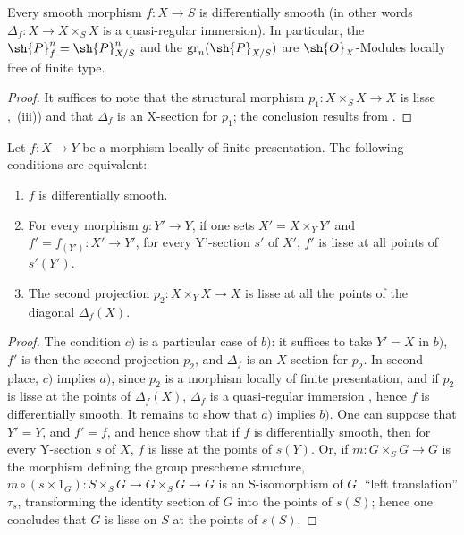 \begin{proposition}[17.12.4]
\label{IV.17.12.4}
Every smooth morphism $f:X\to S$ is differentially smooth (in other words  $\Delta_f:X\to X\times_S X$ is a quasi-regular immersion).
In particular, the $\sh{P}^n_f=\sh{P}^n_{X/S}$ and the $\operatorname{gr}_n(\sh{P}_{X/S})$ are $\sh{O}_X$-Modules locally free of finite type.
\end{proposition}

\begin{proof}
It suffices to note that the structural morphism $p_1:X\times_S X\to X$ is lisse ,~(iii)) and that $\Delta_f$ is an X-section for $p_1$; the conclusion results from .
\end{proof}

\begin{proposition}[17.12.5]
\label{IV.17.12.5}
Let $f:X\to Y$ be a morphism locally of finite presentation.
The following conditions are equivalent:
\begin{enumerate}
  \item[a)] $f$ is differentially smooth.
  \item[b)] For every morphism $g:Y'\to Y$, if one sets $X'=X\times_Y Y'$ and $f'=f_{(Y')}:X'\to Y'$, for every Y'-section $s'$ of $X'$, $f'$ is lisse at all points of $s'(Y')$.
  \item[c)] The second projection $p_2:X\times_Y X\to X$ is lisse at all the points of the diagonal $\Delta_f(X)$.
\end{enumerate}
\end{proposition}


\begin{proof}
The condition $c)$ is a particular case of $b)$: it suffices to take $Y'=X$ in $b)$, $f'$ is then the second projection $p_2$, and $\Delta_f$ is an $X$-section for $p_2$.
In second place, $c)$ implies $a)$, since $p_2$ is a morphism locally of finite presentation, and if $p_2$ is lisse at the points of $\Delta_f(X)$, $\Delta_f$ is a quasi-regular immersion , hence $f$ is differentially smooth.
It remains to show that $a)$ implies $b)$.
One can suppose that $Y'=Y$, and $f'=f$, and hence show that if $f$ is differentially smooth, then for every Y-section $s$ of $X$, $f$ is lisse at the points of $s(Y)$.
Or, if $m:G\times_S G\to G$ is the morphism defining the group prescheme structure, $m\circ(s\times 1_G):S\times_S G\to G\times_S G\to G$ is an S-isomorphism of $G$, ``left translation'' $\tau_s$, transforming the identity section of $G$ into the points of $s(S)$; hence one concludes that $G$ is lisse on $S$ at the points of $s(S)$.
\end{proof}

